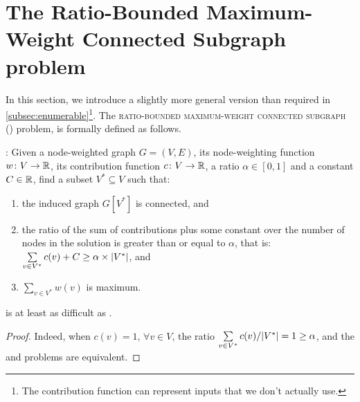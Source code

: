 	\section{The Ratio-Bounded Maximum-Weight Connected Subgraph problem}
	\label{sec:rbmwcs}

		In this section, we introduce a slightly more general version than required in \cref{subsec:enumerable}\footnote{The contribution function can represent inputs that we don't actually use.}.
		The \textsc{ratio-bounded maximum-weight connected subgraph} (\rbmwcs) problem, is formally defined as follows.

		\textbf{\rbmwcs{}}: Given a node-weighted graph $G = (V, E)$, its node-weighting function $w\colon V \to \mathbb{R}$, its contribution function $c\colon V \to \mathbb{R}$, a ratio $\alpha \in [0,1]$ and a constant $C \in \mathbb{R}$, find a subset $V^* \subseteq V$ such that:
			\begin{enumerate}
				\item the induced graph $G\left[V^*\right]$ is connected, and
				\item the ratio of the sum of contributions plus some constant over the number of nodes in the solution is greater than or equal to $\alpha$, that is:\\
					$\sum\limits_{v \in V^*}{c(v)} + C \geq \alpha\times\lvert V^*\rvert$, and
				\item $\sum\limits_{v \in V^*}{w(v)}$ is maximum.
			\end{enumerate}

		\begin{proposition}
			\rbmwcs{} is at least as difficult as \mwcs{}.
		\end{proposition}
		\begin{proof}
			Indeed, when $c(v) = 1,\,\forall v\in V$, the ratio $\sum\limits_{v \in V^*}{c(v)} / \lvert V^*\rvert = 1 \geq \alpha$, and the \mwcs{} and \rbmwcs{} problems are equivalent.
		\end{proof}

